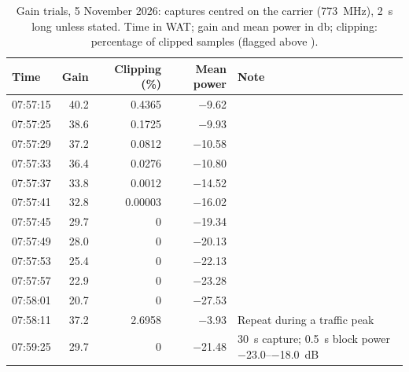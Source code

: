 \begin{table}[tbp]
  \centering
  \small
  \caption[Gain trials: captures centred on the carrier]{Gain trials, 5 November 2026: captures centred on the carrier (\qty{773}{\mega\hertz}), \qty{2}{\second} long unless stated. Time in WAT; gain and mean power in \unit{\decibel}; clipping: percentage of clipped samples (flagged above ).}
  \label{tab:app-gain-carrier}
  \begin{tabularx}{\textwidth}{@{} l r r r >{\raggedright\arraybackslash}X @{}}
    \toprule
    Time & Gain & Clipping (\%) & Mean power & Note \\
    \midrule
    07:57:15 & \num{40.2} & \num{0.4365} & \num{-9.62} &  \\
    07:57:25 & \num{38.6} & \num{0.1725} & \num{-9.93} &  \\
    07:57:29 & \num{37.2} & \num{0.0812} & \num{-10.58} &  \\
    07:57:33 & \num{36.4} & \num{0.0276} & \num{-10.80} &  \\
    07:57:37 & \num{33.8} & \num{0.0012} & \num{-14.52} &  \\
    07:57:41 & \num{32.8} & \num{0.00003} & \num{-16.02} &  \\
    07:57:45 & \num{29.7} & 0 & \num{-19.34} &  \\
    07:57:49 & \num{28.0} & 0 & \num{-20.13} &  \\
    07:57:53 & \num{25.4} & 0 & \num{-22.13} &  \\
    07:57:57 & \num{22.9} & 0 & \num{-23.28} &  \\
    07:58:01 & \num{20.7} & 0 & \num{-27.53} &  \\
    07:58:11 & \num{37.2} & \num{2.6958} & \num{-3.93} & Repeat during a traffic peak \\
    07:59:25 & \num{29.7} & 0 & \num{-21.48} & \qty{30}{\second} capture; \qty{0.5}{\second} block power \numrange{-23.0}{-18.0}~dB \\
    \bottomrule
  \end{tabularx}
\end{table}

